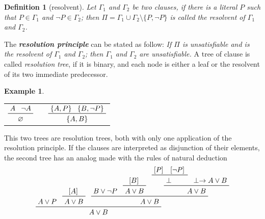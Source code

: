 \documentclass[a4paper,12pt,oneside]{book}
\newtheorem{definition}[theorem]{Definition}
\newtheorem{example}[theorem]{Example}
\let\emptyset\varnothing
\let\o\vee
\let\e\wedge
\let\bottom\perp
\begin{document}
\begin{definition}[resolvent]
Let $\Gamma_1$ and $\Gamma_2$ be two clauses, if there is a literal $P$ such that $P\in\Gamma_1$ and $\neg P\in\Gamma_2$; then $\Pi =\Gamma_1\cup\Gamma_2\setminus\{P,\neg P\}$ is called the resolvent of $\Gamma_1$ and $\Gamma_2$.
\end{definition}
The \textit{\textbf{resolution principle}} can be stated as follow:
\textit{If $\Pi$ is unsatisfiable and is the resolvent of  $\Gamma_1$ and $\Gamma_2$; then  $\Gamma_1$ and $\Gamma_2$ are unsatisfiable.}
A tree of clause is called \textit{resolution tree}, if it is binary, and each node is either a leaf or the resolvent of its two immediate predecessor.

\newpage\noindent\begin{example}
\end{example}
\begin{center}
\begin{tabular}{ccc}
$\prftree{A}{\neg A}{\emptyset}$& \hspace{4cm}&
$\prftree{\{A,P \}}{\{B, \neg P \}}{\{A,B \}}$
\end{tabular}
\end{center}
This two trees are resolution trees, both with only one application of the resolution principle. If the clauses are interpreted as disjunction of their elements, the second tree has an analog made with the rules of natural deduction 
\begin{equation*}
\prftree{\prfassumption{A\o P}}
{\prftree{\prfboundedassumption{A} }{A\o B}}
{\prftree{\prfassumption{B\o\neg P} }{\prftree{\prfboundedassumption{B} }{A\o B}}
 { \prftree{ \prftree{\prfboundedassumption{P}}{\prfboundedassumption{\neg P}}{\bottom}}{\prfassumption{ \bottom\rightarrow A\o B }}{A\o B} } 
{ A\o B} }
{A\o B}
\end{equation*}

\end{document}
